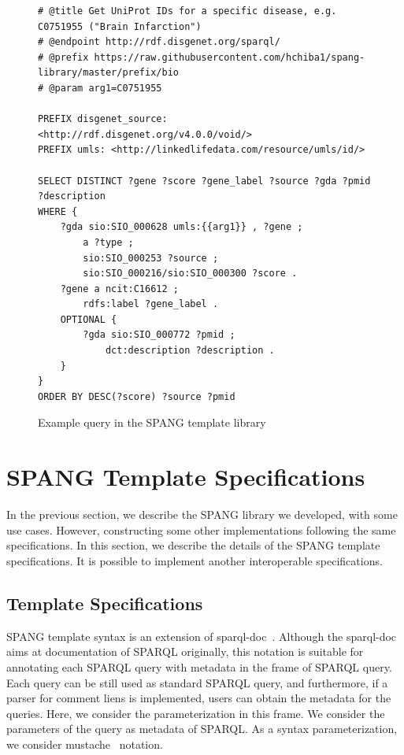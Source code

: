 \documentclass[runningheads]{llncs}
\begin{document}
\begin{figure}[!t]
\begin{scriptsize}
\begin{verbatim}
# @title Get UniProt IDs for a specific disease, e.g. C0751955 ("Brain Infarction")
# @endpoint http://rdf.disgenet.org/sparql/
# @prefix https://raw.githubusercontent.com/hchiba1/spang-library/master/prefix/bio
# @param arg1=C0751955 

PREFIX disgenet_source: <http://rdf.disgenet.org/v4.0.0/void/>
PREFIX umls: <http://linkedlifedata.com/resource/umls/id/>

SELECT DISTINCT ?gene ?score ?gene_label ?source ?gda ?pmid ?description
WHERE {
    ?gda sio:SIO_000628 umls:{{arg1}} , ?gene ;
        a ?type ;
        sio:SIO_000253 ?source ;
        sio:SIO_000216/sio:SIO_000300 ?score .
    ?gene a ncit:C16612 ;
        rdfs:label ?gene_label .
    OPTIONAL {
        ?gda sio:SIO_000772 ?pmid ;
            dct:description ?description .
    }
}
ORDER BY DESC(?score) ?source ?pmid

\end{verbatim}
\end{scriptsize}
\caption{Example query in the SPANG template library}
\label{fig:example-sparql}
\end{figure}


\section{SPANG Template Specifications}

In the previous section, we describe the SPANG library we developed, with some use cases.
However, constructing some other implementations following the same specifications.
In this section, we describe the details of the SPANG template specifications.
It is possible to implement another interoperable specifications.


\subsection{Template Specifications}
SPANG template syntax is an extension of sparql-doc~\cite{sparql-doc}. Although the sparql-doc aims at documentation of SPARQL originally, this notation is suitable for annotating each SPARQL query with metadata in the frame of SPARQL query. Each query can be still used as standard SPARQL query, and furthermore, if a parser for comment liens is implemented, users can obtain the metadata for the queries.
Here, we consider the parameterization in this frame. We consider the parameters of the query as metadata of SPARQL.
As a syntax parameterization, we consider mustache~\cite{mustache} notation.
\end{document}
